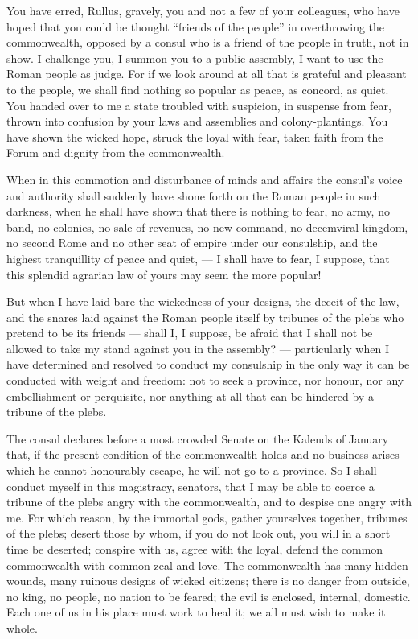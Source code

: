  You have erred, Rullus, gravely, you and not a few of your colleagues, who have hoped that you could be thought ``friends of the people'' in overthrowing the commonwealth, opposed by a consul who is a friend of the people in truth, not in show. I challenge you, I summon you to a public assembly, I want to use the Roman people as judge. For if we look around at all that is grateful and pleasant to the people, we shall find nothing so popular as peace, as concord, as quiet. You handed over to me a state troubled with suspicion, in suspense from fear, thrown into confusion by your laws and assemblies and colony-plantings. You have shown the wicked hope, struck the loyal with fear, taken faith from the Forum and dignity from the commonwealth.

 When in this commotion and disturbance of minds and affairs the consul's voice and authority shall suddenly have shone forth on the Roman people in such darkness, when he shall have shown that there is nothing to fear, no army, no band, no colonies, no sale of revenues, no new command, no decemviral kingdom, no second Rome and no other seat of empire under our consulship, and the highest tranquillity of peace and quiet, --- I shall have to fear, I suppose, that this splendid agrarian law of yours may seem the more popular!

 But when I have laid bare the wickedness of your designs, the deceit of the law, and the snares laid against the Roman people itself by tribunes of the plebs who pretend to be its friends --- shall I, I suppose, be afraid that I shall not be allowed to take my stand against you in the assembly? --- particularly when I have determined and resolved to conduct my consulship in the only way it can be conducted with weight and freedom: not to seek a province, nor honour, nor any embellishment or perquisite, nor anything at all that can be hindered by a tribune of the plebs.

 The consul declares before a most crowded Senate on the Kalends of January that, if the present condition of the commonwealth holds and no business arises which he cannot honourably escape, he will not go to a province. So I shall conduct myself in this magistracy, senators, that I may be able to coerce a tribune of the plebs angry with the commonwealth, and to despise one angry with me. For which reason, by the immortal gods, gather yourselves together, tribunes of the plebs; desert those by whom, if you do not look out, you will in a short time be deserted; conspire with us, agree with the loyal, defend the common commonwealth with common zeal and love. The commonwealth has many hidden wounds, many ruinous designs of wicked citizens; there is no danger from outside, no king, no people, no nation to be feared; the evil is enclosed, internal, domestic. Each one of us in his place must work to heal it; we all must wish to make it whole.

